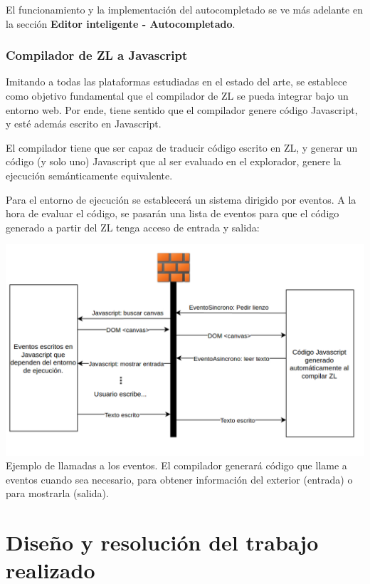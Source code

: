 \documentclass{report}
\begin{document}
	El funcionamiento y la implementación del autocompletado se ve más adelante en la sección \textbf{Editor inteligente - Autocompletado}.
	
	\subsection{Compilador de ZL a Javascript}
	
	Imitando a todas las plataformas estudiadas en el estado del arte, se establece como objetivo fundamental que el compilador de ZL se pueda integrar bajo un entorno web. Por ende, tiene sentido que el compilador genere código Javascript, y esté además escrito en Javascript. 
	
	\vspace{10px}
	
	El compilador tiene que ser capaz de traducir código escrito en ZL, y generar un código (y solo uno) Javascript que al ser evaluado en el explorador, genere la ejecución semánticamente equivalente. 

	\vspace{10px}
	
	Para el entorno de ejecución se establecerá un sistema dirigido por eventos. A la hora de evaluar el código, se pasarán una lista de eventos para que el código generado a partir del ZL tenga acceso de entrada y salida:
	
	\begin{center}
	\includegraphics[width=1\linewidth]{diagramaeventos}
	Ejemplo de llamadas a los eventos. El compilador generará código que llame a eventos cuando sea necesario, para obtener información del exterior (entrada) o para mostrarla (salida).
	\end{center}


	\chapter{Diseño y resolución del trabajo realizado}
	
\end{document}
